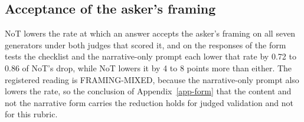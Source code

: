 \subsection{Acceptance of the asker's framing}
\label{app-framing}

NoT lowers the rate at which an answer accepts the asker's framing on all
seven generators under both judges that scored it, and on the responses of
the form tests the checklist and the narrative-only prompt each lower that
rate by 0.72 to 0.86 of NoT's drop, while NoT lowers it by 4 to 8
points more than either.
The registered reading is FRAMING-MIXED, because the narrative-only prompt
also lowers the rate, so the conclusion of Appendix~\ref{app-form} that the
content and not the narrative form carries the reduction holds for judged
validation and not for this rubric.

